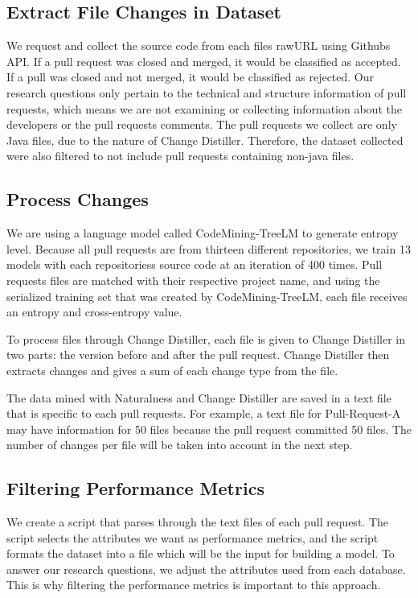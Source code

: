 \documentclass[10pt, conference]{IEEEtran}
\begin{document}
\subsection{Extract File Changes in Dataset}
We request and collect the source code from each file\textquotesingle s rawURL using Github\textquotesingle s API. If a pull request was closed and merged, it would be classified as accepted. If a pull was closed and not merged, it would be classified as rejected. Our research questions only pertain to the technical and structure information of pull requests, which means we are not examining or collecting information about the developers or the pull request\textquotesingle s comments. The pull requests we collect are only Java files, due to the nature of Change Distiller. Therefore, the dataset collected were also filtered to not include pull requests containing non-java files.

\subsection{Process Changes}
We are using a language model called CodeMining-TreeLM to generate entropy level. Because all pull requests are from thirteen different repositories, we train 13 models with each repositories\textquotesingle s source code at an iteration of 400 times. Pull request\textquotesingle s files are matched with their respective project name, and using the serialized training set that was created by CodeMining-TreeLM, each file receives an entropy and cross-entropy value.

To process files through Change Distiller, each file is given to Change Distiller in two parts: the version before and after the pull request. Change Distiller then extracts changes and gives a sum of each change type from the file. 

The data mined with Naturalness and Change Distiller are saved in a text file that is specific to each pull requests. For example, a text file for Pull-Request-A may have information for 50 files because the pull request committed 50 files. The number of changes per file will be taken into account in the next step.

\subsection{Filtering Performance Metrics}
We create a script that parses through the text files of each pull request. The script selects the attributes we want as performance metrics, and the script formats the dataset into a file which will be the input for building a model. To answer our research questions, we adjust the attributes used from each database. This is why filtering the performance metrics is important to this approach.
\end{document}
